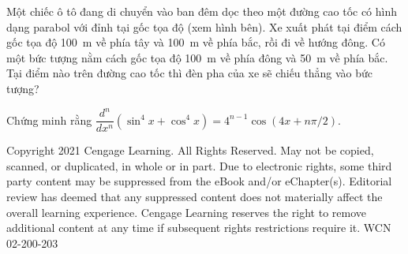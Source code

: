 \begin{minipage}[t]{0.73\textwidth}
\begin{list}{}
    \item[\textbf{8.}] Một chiếc ô tô đang di chuyển vào ban đêm dọc theo một đường cao tốc có hình dạng parabol với đỉnh tại gốc tọa độ (xem hình bên). Xe xuất phát tại điểm cách gốc tọa độ 100~m về phía tây và 100~m về phía bắc, rồi đi về hướng đông. Có một bức tượng nằm cách gốc tọa độ 100~m về phía đông và 50~m về phía bắc. Tại điểm nào trên đường cao tốc thì đèn pha của xe sẽ chiếu thẳng vào bức tượng?

    \item[\textbf{9.}] Chứng minh rằng $\dfrac{d^n}{dx^n}(\sin^4 x + \cos^4 x) = 4^{n-1}\cos(4x + n\pi/2)$.
  \end{list}
\end{minipage}

\vfill
\noindent
{}

\vspace{2pt}
\noindent
{\fontsize{5}{6}\selectfont\color{stewartgray}%
Copyright 2021 Cengage Learning. All Rights Reserved. May not be copied, scanned, or duplicated, in whole or in part. Due to electronic rights, some third party content may be suppressed from the eBook and/or eChapter(s). Editorial review has deemed that any suppressed content does not materially affect the overall learning experience. Cengage Learning reserves the right to remove additional content at any time if subsequent rights restrictions require it. WCN 02-200-203\par}
